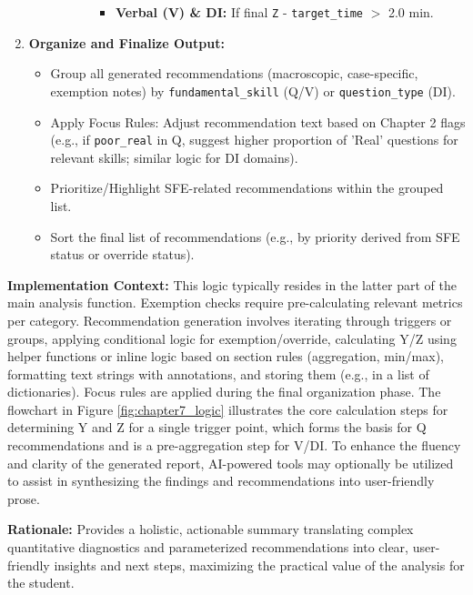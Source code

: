 \documentclass{article}
\begin{document}
\begin{enumerate}
\begin{itemize}
\begin{enumerate}
\begin{itemize}
\begin{itemize}
                                \item \textbf{Verbal (V) \& DI:} If final \texttt{Z} - \texttt{target\_time} $>$ 2.0 min.
                            \end{itemize}
                    \end{itemize}
            \end{enumerate}
    \end{itemize}
    \item \textbf{Organize and Finalize Output:}
    \begin{itemize}
        \item Group all generated recommendations (macroscopic, case-specific, exemption notes) by \texttt{fundamental\_skill} (Q/V) or \texttt{question\_type} (DI).
        \item Apply Focus Rules: Adjust recommendation text based on Chapter 2 flags (e.g., if \texttt{poor\_real} in Q, suggest higher proportion of 'Real' questions for relevant skills; similar logic for DI domains).
        \item Prioritize/Highlight SFE-related recommendations within the grouped list.
        \item Sort the final list of recommendations (e.g., by priority derived from SFE status or override status).
    \end{itemize}
\end{enumerate}

\textbf{Implementation Context:} This logic typically resides in the latter part of the main analysis function. Exemption checks require pre-calculating relevant metrics per category. Recommendation generation involves iterating through triggers or groups, applying conditional logic for exemption/override, calculating Y/Z using helper functions or inline logic based on section rules (aggregation, min/max), formatting text strings with annotations, and storing them (e.g., in a list of dictionaries). Focus rules are applied during the final organization phase. The flowchart in Figure \ref{fig:chapter7_logic} illustrates the core calculation steps for determining Y and Z for a single trigger point, which forms the basis for Q recommendations and is a pre-aggregation step for V/DI. To enhance the fluency and clarity of the generated report, AI-powered tools may optionally be utilized to assist in synthesizing the findings and recommendations into user-friendly prose.

\textbf{Rationale:} Provides a holistic, actionable summary translating complex quantitative diagnostics and parameterized recommendations into clear, user-friendly insights and next steps, maximizing the practical value of the analysis for the student.
\end{document}
